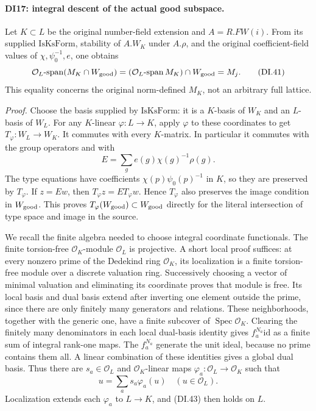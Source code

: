\paragraph{DI17: integral descent of the actual good subspace.}
\label{claim:DI17}
Let \(K\subset L\) be the original number-field extension and
\(A=R.FW(i)\). From its supplied \(\mathrm{IsKsForm}\), stability
of \(A.W_K\) under \(A.\rho\), and the original coefficient-field
values of \(\chi,\psi_0^{-1},e\), one obtains
\[
 \mathcal O_L\!\operatorname{-span}(M_K\cap W_{\rm good})
            =(\mathcal O_L\!\operatorname{-span}M_K)
                                      \cap W_{\rm good}=M_j.
 \tag{DI.41}
\]
This equality concerns the original norm-defined \(M_K\), not an
arbitrary full lattice.

\emph{Proof.}
Choose the basis supplied by \(\mathrm{IsKsForm}\): it is a
\(K\)-basis of \(W_K\) and an \(L\)-basis of \(W_L\).
For any \(K\)-linear \(\varphi:L\to K\), apply \(\varphi\)
to these coordinates to get \(T_\varphi:W_L\to W_K\).
It commutes with every \(K\)-matrix. In particular it commutes
with the group operators and with
\[
               E=\sum_g e(g)\chi(g)^{-1}\rho(g).
 \tag{DI.42}
\]
The type equations have coefficients \(\chi(p)\psi_0(p)^{-1}\)
in \(K\), so they are preserved by \(T_\varphi\). If \(z=Ew\),
then \(T_\varphi z=E T_\varphi w\). Hence \(T_\varphi\) also
preserves the image condition in \(W_{\rm good}\). This proves
\(T_\varphi(W_{\rm good})\subset W_{\rm good}\) directly for
the literal intersection of type space and image in the source.

We recall the finite algebra needed to choose integral coordinate
functionals. The finite torsion-free \(\mathcal O_K\)-module
\(\mathcal O_L\) is projective. A short local proof suffices:
at every nonzero prime of the Dedekind ring \(\mathcal O_K\),
its localization is a finite torsion-free module over a discrete
valuation ring. Successively choosing a vector of minimal valuation
and eliminating its coordinate proves that module is free. Its local
basis and dual basis extend after inverting one element outside the
prime, since there are only finitely many generators and relations.
These neighborhoods, together with the generic one, have a finite
subcover of \(\operatorname{Spec}\mathcal O_K\). Clearing the
finitely many denominators in each local dual-basis identity gives
\(f_a^{N_a}\mathrm{id}\) as a finite sum of integral rank-one
maps. The \(f_a^{N_a}\) generate the unit ideal, because no prime
contains them all. A linear combination of these identities gives
a global dual basis. Thus there are \(s_a\in\mathcal O_L\) and
\(\mathcal O_K\)-linear maps \(\varphi_a:\mathcal O_L\to
\mathcal O_K\) such that
\[
                     u=\sum_a s_a\varphi_a(u)
                               \quad(u\in\mathcal O_L).
 \tag{DI.43}
\]
Localization extends each \(\varphi_a\) to \(L\to K\), and
(DI.43) then holds on \(L\).

